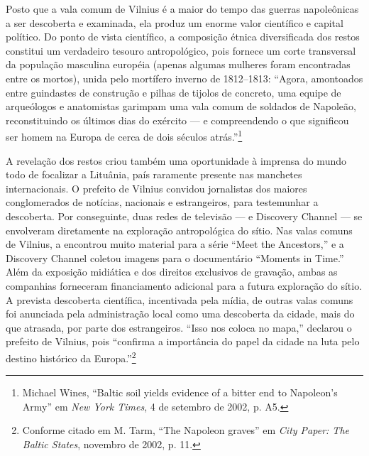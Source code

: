 Posto que a vala comum de Vilnius é a maior do tempo das guerras
napoleônicas a ser descoberta e examinada, ela produz um enorme valor
científico e capital político. Do ponto de vista científico, a
composição étnica diversificada dos restos constitui um verdadeiro
tesouro antropológico, pois fornece um corte transversal da população
masculina européia (apenas algumas mulheres foram encontradas entre os
mortos), unida pelo mortífero inverno de 1812--1813: ``Agora, amontoados
entre guindastes de construção e pilhas de tijolos de concreto, uma
equipe de arqueólogos e anatomistas garimpam uma vala comum de soldados
de Napoleão, reconstituindo os últimos dias do exército --- e
compreendendo o que significou ser homem na Europa de cerca de dois
séculos atrás.''\footnote{Michael Wines, ``Baltic soil yields evidence
  of a bitter end to Napoleon's Army'' em \emph{New York Times}, 4 de
  setembro de 2002, p. A5.}

A revelação dos restos criou também uma oportunidade à imprensa do mundo
todo de focalizar a Lituânia, país raramente presente nas manchetes
internacionais. O prefeito de Vilnius convidou jornalistas dos maiores
conglomerados de notícias, nacionais e estrangeiros, para testemunhar a
descoberta. Por conseguinte, duas redes de televisão ---  e Discovery
Channel --- se envolveram diretamente na exploração antropológica do
sítio. Nas valas comuns de Vilnius, a  encontrou muito material para
a série ``Meet the Ancestors,'' e a Discovery Channel coletou imagens
para o documentário ``Moments in Time.'' Além da exposição midiática e
dos direitos exclusivos de gravação, ambas as companhias forneceram
financiamento adicional para a futura exploração do sítio. A prevista
descoberta científica, incentivada pela mídia, de outras valas comuns
foi anunciada pela administração local como uma descoberta da cidade,
mais do que atrasada, por parte dos estrangeiros. ``Isso nos coloca no
mapa,'' declarou o prefeito de Vilnius, pois ``confirma a importância do
papel da cidade na luta pelo destino histórico da Europa.''\footnote{Conforme
  citado em M. Tarm, ``The Napoleon graves'' em \emph{City Paper: The
  Baltic States}, novembro de 2002, p. 11.}

